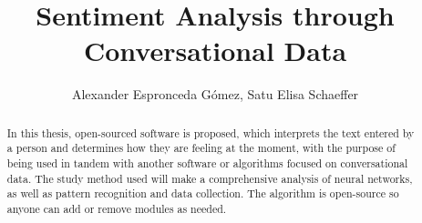 \documentclass[a4]{sciposter}
\title{Sentiment Analysis through Conversational Data}
\author{Alexander Espronceda Gómez, Satu Elisa Schaeffer}
\institute {Facultad de Ingeniería Mecánica y Eléctrica}
\begin{document}

\maketitle
\begin{abstract}
In this thesis, open-sourced software is proposed, which interprets the text entered by a person and determines how they are feeling at the moment, with the purpose of being used in tandem with another software or algorithms focused on conversational data.
The study method used will make a comprehensive analysis of neural networks, as well as pattern recognition and data collection.
The algorithm is open-source so anyone can add or remove modules as needed.
\end{abstract}
\end{document}
